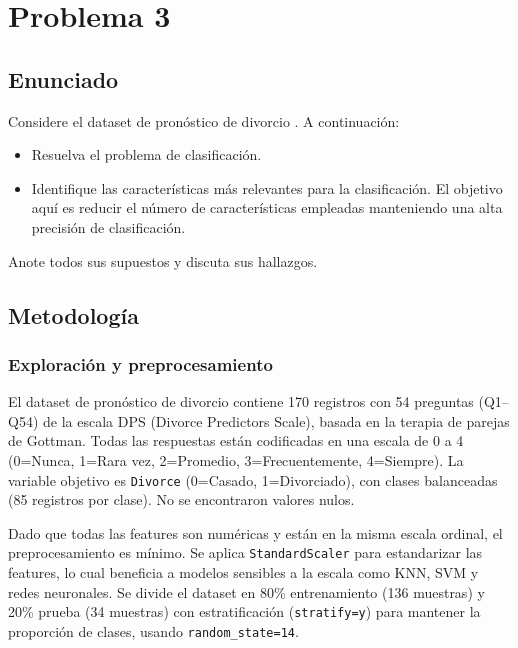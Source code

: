 \documentclass{article}
\begin{document}
\section{Problema 3}

\subsection{Enunciado}

Considere el dataset de pronóstico de divorcio \cite{kaggleDivorcePrediction}. A continuación:
\begin{itemize}
    \item [a)] Resuelva el problema de clasificación.
    \item [b)] Identifique las características más relevantes para la clasificación. El objetivo aquí es reducir el número de características empleadas manteniendo una alta precisión de clasificación.
\end{itemize}
Anote todos sus supuestos y discuta sus hallazgos.

\subsection{Metodología}

\subsubsection{Exploración y preprocesamiento}

El dataset de pronóstico de divorcio contiene 170 registros con 54 preguntas (Q1--Q54) de la escala DPS (Divorce Predictors Scale), basada en la terapia de parejas de Gottman. Todas las respuestas están codificadas en una escala de 0 a 4 (0=Nunca, 1=Rara vez, 2=Promedio, 3=Frecuentemente, 4=Siempre). La variable objetivo es \texttt{Divorce} (0=Casado, 1=Divorciado), con clases balanceadas (85 registros por clase). No se encontraron valores nulos.

Dado que todas las features son numéricas y están en la misma escala ordinal, el preprocesamiento es mínimo. Se aplica \texttt{StandardScaler} para estandarizar las features, lo cual beneficia a modelos sensibles a la escala como KNN, SVM y redes neuronales. Se divide el dataset en 80\% entrenamiento (136 muestras) y 20\% prueba (34 muestras) con estratificación (\texttt{stratify=y}) para mantener la proporción de clases, usando \texttt{random\_state=14}.
\end{document}
